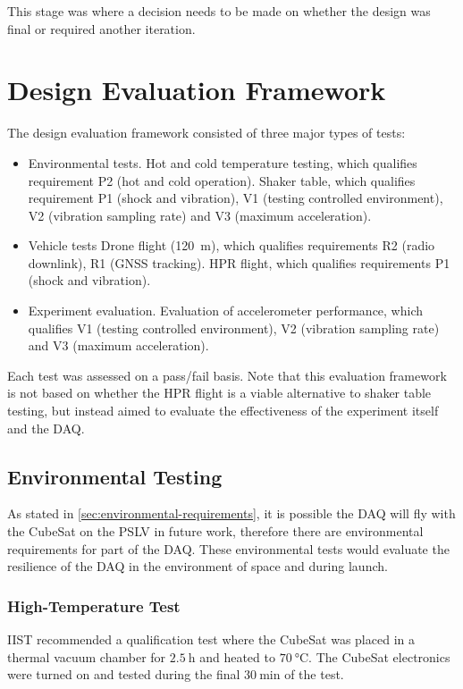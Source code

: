 \documentclass{report}
\begin{document}
This stage was where a decision needs to be made on whether the design was final or required another iteration.

\section{Design Evaluation Framework}

The design evaluation framework consisted of three major types of tests:

\begin{itemize}
  \item Environmental tests.
        \subitem Hot and cold temperature testing, which qualifies requirement P2 (hot and cold operation).
        \subitem Shaker table, which qualifies requirement P1 (shock and vibration), V1 (testing controlled environment), V2 (vibration sampling rate) and V3 (maximum acceleration).
  \item Vehicle tests
        \subitem Drone flight (\SI{120}{\metre}), which qualifies requirements R2 (radio downlink), R1 (GNSS tracking).
        \subitem HPR flight, which qualifies requirements P1 (shock and vibration).
  \item Experiment evaluation.
        \subitem Evaluation of accelerometer performance, which qualifies V1 (testing controlled environment), V2 (vibration sampling rate) and V3 (maximum acceleration).
\end{itemize}

Each test was assessed on a pass/fail basis. Note that this evaluation framework is not based on whether the HPR flight is a viable alternative to shaker table testing, but instead aimed to evaluate the effectiveness of the experiment itself and the DAQ.

\subsection{Environmental Testing}

As stated in \ref{sec:environmental-requirements}, it is possible the DAQ will fly with the CubeSat on the PSLV in future work, therefore there are environmental requirements for part of the DAQ.
These environmental tests would evaluate the resilience of the DAQ in the environment of space and during launch.

\subsubsection{High-Temperature Test}
\label{sec:htemp-test-framework}
IIST recommended a qualification test where the CubeSat was placed in a thermal vacuum chamber for $\SI{2.5}{\hour}$ and heated to $\SI{70}{\degreeCelsius}$. The CubeSat electronics were turned on and tested during the final $\SI{30}{\minute}$ of the test.
\end{document}
